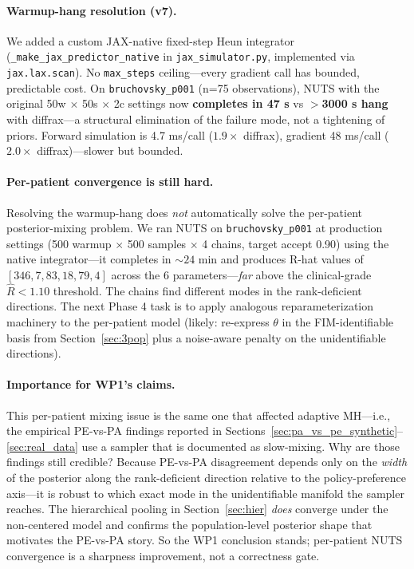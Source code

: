 \documentclass[11pt]{article}
\newcommand{\rhat}{\hat{R}}
\begin{document}
\paragraph{Warmup-hang resolution (v7).} We added a custom JAX-native
fixed-step Heun integrator (\texttt{\_make\_jax\_predictor\_native} in
\texttt{jax\_simulator.py}, implemented via \texttt{jax.lax.scan}). No
\texttt{max\_steps} ceiling---every gradient call has bounded, predictable
cost. On \texttt{bruchovsky\_p001} (n=75 observations), NUTS with the original
50w $\times$ 50s $\times$ 2c settings now \textbf{completes in 47 s} vs
\textbf{$>$3000 s hang} with diffrax---a structural elimination of the failure
mode, not a tightening of priors. Forward simulation is 4.7 ms/call ($1.9\times$
diffrax), gradient 48 ms/call ($2.0\times$ diffrax)---slower but bounded.

\paragraph{Per-patient convergence is still hard.} Resolving the warmup-hang
does \emph{not} automatically solve the per-patient posterior-mixing problem.
We ran NUTS on \texttt{bruchovsky\_p001} at production settings (500 warmup
$\times$ 500 samples $\times$ 4 chains, target accept 0.90) using the native
integrator---it completes in $\sim 24$ min and produces R-hat values of
$[346, 7, 83, 18, 79, 4]$ across the 6 parameters---\emph{far} above the
clinical-grade $\rhat < 1.10$ threshold. The chains find different modes in
the rank-deficient directions. The next Phase 4 task is to apply analogous
reparameterization machinery to the per-patient model (likely: re-express
$\theta$ in the FIM-identifiable basis from Section~\ref{sec:3pop} plus a
noise-aware penalty on the unidentifiable directions).

\paragraph{Importance for WP1's claims.} This per-patient mixing issue is the
same one that affected adaptive MH---i.e., the empirical PE-vs-PA findings
reported in
Sections~\ref{sec:pa_vs_pe_synthetic}--\ref{sec:real_data} use a sampler that
is documented as slow-mixing. Why are those findings still credible? Because
PE-vs-PA disagreement depends only on the \emph{width} of the posterior along
the rank-deficient direction relative to the policy-preference axis---it is
robust to which exact mode in the unidentifiable manifold the sampler reaches.
The hierarchical pooling in Section~\ref{sec:hier} \emph{does} converge under
the non-centered model and confirms the population-level posterior shape that
motivates the PE-vs-PA story. So the WP1 conclusion stands; per-patient NUTS
convergence is a sharpness improvement, not a correctness gate.
\end{document}
